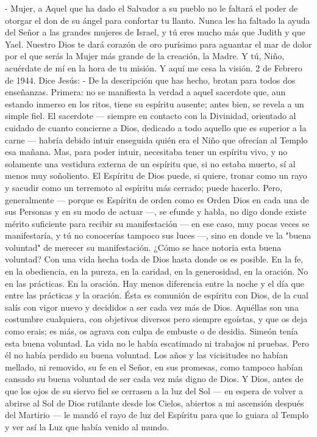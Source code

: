 \documentclass[12pt]{book} %
\begin{document}
- Mujer, a Aquel que ha dado el Salvador a su pueblo no le faltará el poder de otorgar el don de su ángel para confortar 
tu llanto. Nunca les ha faltado la ayuda del Señor a las grandes mujeres de Israel, y tú eres mucho más que Judith y que Yael. Nuestro Dios te dará corazón de oro purísimo para aguantar el mar de dolor por el que serás la Mujer más grande de la creación, la Madre. Y tú, Niño, acuérdate de mí en la hora de tu misión. 
Y aquí me cesa la visión. 
2 de Febrero de 1944. 
Dice Jesús: 
- De la descripción que has hecho, brotan para todos dos enseñanzas. 
Primera: no se manifiesta la verdad a aquel sacerdote que, aun estando inmerso en los ritos, tiene su espíritu ausente; 
antes bien, se revela a un simple fiel. 
El sacerdote — siempre en contacto con la Divinidad, orientado al cuidado de cuanto concierne a Dios, dedicado a todo 
aquello que es superior a la carne — habría debido intuir enseguida quién era el Niño que ofrecían al Templo esa mañana. Mas, para poder intuir, necesitaba tener un espíritu vivo, y no solamente una vestidura externa de un espíritu que, si no estaba muerto, sí al menos muy soñoliento. 
El Espíritu de Dios puede, si quiere, tronar como un rayo y sacudir como un terremoto al espíritu más cerrado; puede hacerlo. Pero, generalmente — porque es Espíritu de orden como es Orden Dios en cada una de sus Personas y en su modo de actuar —, se efunde y habla, no digo donde existe mérito suficiente para recibir su manifestación — en ese caso, muy pocas veces se manifestaría, y tú no conocerías tampoco sus luces —, sino en donde ve la "buena voluntad" de merecer su manifestación. 
¿Cómo se hace notoria esta buena voluntad? Con una vida hecha toda de Dios hasta donde os es posible. En la fe, en la 
obediencia, en la pureza, en la caridad, en la generosidad, en la oración. No en las prácticas. En la oración. Hay menos diferencia entre la noche y el día que entre las prácticas y la oración. Ésta es comunión de espíritu con Dios, de la cual salís con vigor nuevo y decididos a ser cada vez más de Dios. Aquéllas son una costumbre cualquiera, con objetivos diversos pero siempre egoístas, y que os deja como erais; es más, os agrava con culpa de embuste o de desidia. 
Simeón tenía esta buena voluntad. La vida no le había escatimado ni trabajos ni pruebas. Pero él no había perdido su buena voluntad. Los años y las vicisitudes no habían mellado, ni removido, su fe en el Señor, en sus promesas, como tampoco habían cansado su buena voluntad de ser cada vez más digno de Dios. Y Dios, antes de que los ojos de su siervo fiel se cerrasen a la luz del Sol — en espera de volver a abrirse al Sol de Dios rutilante desde los Cielos, abiertos a mi ascensión después del Martirio — le mandó el rayo de luz del Espíritu para que lo guiara al Templo y ver así la Luz que había venido al mundo. 
\end{document}
